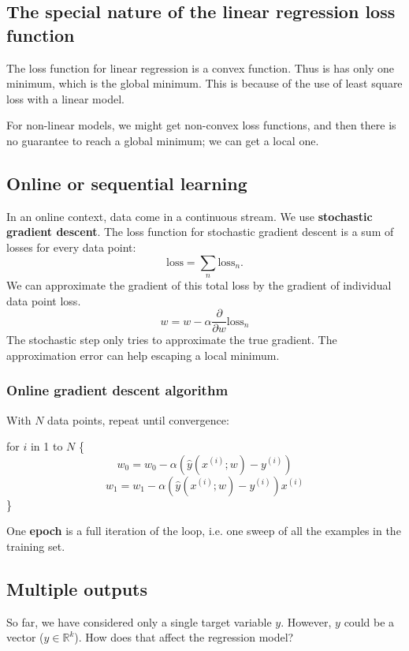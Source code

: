 \documentclass[a4paper,12pt]{article}
\begin{document}
\subsection{The special nature of the linear regression loss function}

The loss function for linear regression is a convex function. Thus is has only one minimum, which is the global minimum. This is because of the use of least square loss with a linear model. 

For non-linear models, we might get non-convex loss functions, and then there is no guarantee to reach a global minimum; we can get a local one. 

\subsection{Online or sequential learning}

In an online context, data come in a continuous stream. We use \textbf{stochastic gradient descent}. The loss function for stochastic gradient descent is a sum of losses for every data point: 
$$\text{loss} = \sum_n \text{loss}_n.$$
We can approximate the gradient of this total loss by the gradient of individual data point loss. 
$$w = w -\alpha \frac{\partial}{\partial w} \text{loss}_n$$
The stochastic step only tries to approximate the true gradient. The approximation error can help escaping a local minimum. 

\subsubsection{Online gradient descent algorithm}

With $N$ data points, repeat until convergence: 

\noindent for $i$ in 1 to $N$ \{ 
$$w_0 = w_0 - \alpha (\hat y(x^{(i)}; w) - y^{(i)})$$
$$w_1 = w_1 - \alpha (\hat y(x^{(i)}; w) - y^{(i)})x^{(i)}$$
\}

One \textbf{epoch} is a full iteration of the loop, i.e. one sweep of all the examples in the training set. 

\subsection{Multiple outputs}

So far, we have considered only a single target variable $y$. However, $y$ could be a vector ($y \in \mathbb{R}^k$). How does that affect the regression model? 
\end{document}
